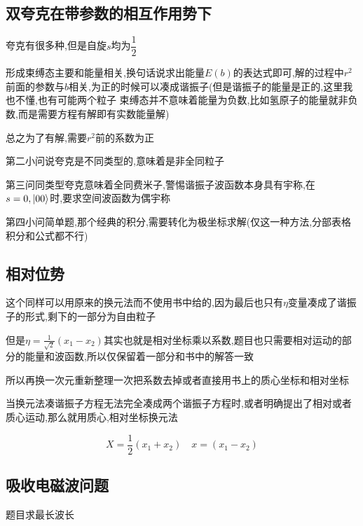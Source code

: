         \subsection{双夸克在带参数的相互作用势下}
            \begin{formal}
                夸克有很多种,但是自旋$s$均为$\dfrac{1}{2}$
            \end{formal}

            形成束缚态主要和能量相关,换句话说求出能量$E(b)$的表达式即可,解的过程中$r^{2}$前面的参数与$b$相关,为正的时候可以凑成谐振子(但是谐振子的能量是正的,这里我也不懂,也有可能两个粒子
            束缚态并不意味着能量为负数,比如氢原子的能量就非负数,而是需要方程有解即有实数能量解)
            
            总之为了有解,需要$r^{2}$前的系数为正

            第二小问说夸克是不同类型的,意味着是非全同粒子

            第三问同类型夸克意味着全同费米子,警惕谐振子波函数本身具有宇称,在$s=0,\ket{00}$时,要求空间波函数为偶宇称

            第四小问简单题,那个经典的积分,需要转化为极坐标求解(仅这一种方法,分部表格积分和公式都不行)

        \subsection{相对位势}
            这个同样可以用原来的换元法而不使用书中给的,因为最后也只有$\eta$变量凑成了谐振子的形式,剩下的一部分为自由粒子

            但是$\eta = \frac{1}{\sqrt{2}}(x_{1} - x_{2})$其实也就是相对坐标乘以系数,题目也只需要相对运动的部分的能量和波函数,所以仅保留着一部分和书中的解答一致

            所以再换一次元重新整理一次把系数去掉或者直接用书上的质心坐标和相对坐标

            \begin{formal}
                当换元法凑谐振子方程无法完全凑成两个谐振子方程时,或者明确提出了相对或者质心运动,那么就用质心,相对坐标换元法

                $$
                X = \frac{1}{2}(x_{1}+x_{2}) \quad x = (x_{1} - x_{2})
                $$

            \end{formal}

        \subsection{吸收电磁波问题}
            题目求最长波长

